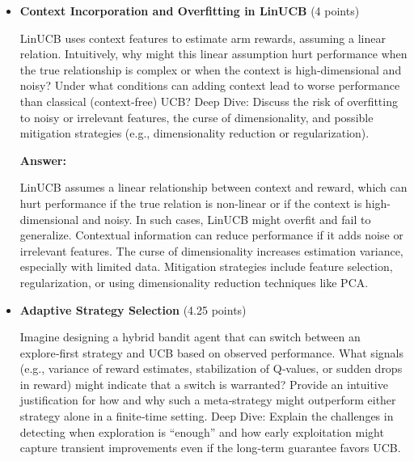 \documentclass[12pt]{article}
\begin{document}
{{{\begin{itemize}[noitemsep]
    \textbf{Answer:}

    Hyperparameters like \(\epsilon\) in \(\epsilon\)-greedy, the exploration constant in UCB, and \(\alpha\) in LinUCB critically affect the balance between exploration and exploitation. Slight mismatches can lead to under-exploration (missing the optimal arm) or over-exploration (wasting time on bad arms). In finite runs, these parameters are fragile, small errors in tuning can severely hurt performance. A self-adaptive mechanism could monitor reward variance, convergence of Q-values, or rate of change in estimated rewards, and adjust exploration dynamically, for example decaying \(\epsilon\) or adjusting \(\alpha\) based on stability.
    
    \item \textbf{Context Incorporation and Overfitting in LinUCB} (4 points)

    \vspace{0.25cm}
    LinUCB uses context features to estimate arm rewards, assuming a linear relation. Intuitively, why might this linear assumption hurt performance when the true relationship is complex or when the context is high‑dimensional and noisy? Under what conditions can adding context lead to worse performance than classical (context‑free) UCB?
    Deep Dive:
    Discuss the risk of overfitting to noisy or irrelevant features, the curse of dimensionality, and possible mitigation strategies (e.g., dimensionality reduction or regularization).
    \vspace{0.5cm}

    \textbf{Answer:}

    LinUCB assumes a linear relationship between context and reward, which can hurt performance if the true relation is non-linear or if the context is high-dimensional and noisy. In such cases, LinUCB might overfit and fail to generalize. Contextual information can reduce performance if it adds noise or irrelevant features. The curse of dimensionality increases estimation variance, especially with limited data. Mitigation strategies include feature selection, regularization, or using dimensionality reduction techniques like PCA.

    \item \textbf{Adaptive Strategy Selection} (4.25 points)

    \vspace{0.25cm}
    Imagine designing a hybrid bandit agent that can switch between an explore‑first strategy and UCB based on observed performance. What signals (e.g., variance of reward estimates, stabilization of Q‑values, or sudden drops in reward) might indicate that a switch is warranted? Provide an intuitive justification for how and why such a meta‑strategy might outperform either strategy alone in a finite‑time setting.
    Deep Dive:
    Explain the challenges in detecting when exploration is “enough” and how early exploitation might capture transient improvements even if the long‑term guarantee favors UCB.
    \vspace{0.5cm}


\end{itemize}}}}
\end{document}
